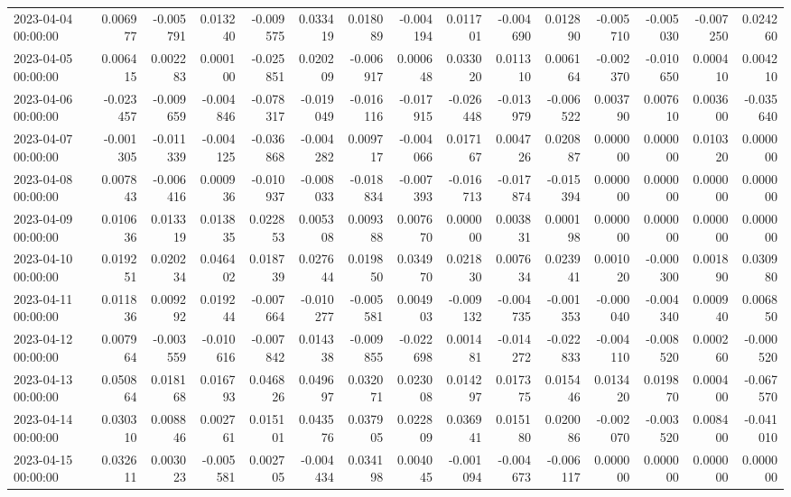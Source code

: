 \begin{tabular}{lrrrrrrrrrrrrrr}
2023-04-04 00:00:00 & 0.006977 & -0.005791 & 0.013240 & -0.009575 & 0.033419 & 0.018089 & -0.004194 & 0.011701 & -0.004690 & 0.012890 & -0.005710 & -0.005030 & -0.007250 & 0.024260 \\
2023-04-05 00:00:00 & 0.006415 & 0.002283 & 0.000100 & -0.025851 & 0.020209 & -0.006917 & 0.000648 & 0.033020 & 0.011310 & 0.006164 & -0.002370 & -0.010650 & 0.000410 & 0.004210 \\
2023-04-06 00:00:00 & -0.023457 & -0.009659 & -0.004846 & -0.078317 & -0.019049 & -0.016116 & -0.017915 & -0.026448 & -0.013979 & -0.006522 & 0.003790 & 0.007610 & 0.003600 & -0.035640 \\
2023-04-07 00:00:00 & -0.001305 & -0.011339 & -0.004125 & -0.036868 & -0.004282 & 0.009717 & -0.004066 & 0.017167 & 0.004726 & 0.020887 & 0.000000 & 0.000000 & 0.010320 & 0.000000 \\
2023-04-08 00:00:00 & 0.007843 & -0.006416 & 0.000936 & -0.010937 & -0.008033 & -0.018834 & -0.007393 & -0.016713 & -0.017874 & -0.015394 & 0.000000 & 0.000000 & 0.000000 & 0.000000 \\
2023-04-09 00:00:00 & 0.010636 & 0.013319 & 0.013835 & 0.022853 & 0.005308 & 0.009388 & 0.007670 & 0.000000 & 0.003831 & 0.000198 & 0.000000 & 0.000000 & 0.000000 & 0.000000 \\
2023-04-10 00:00:00 & 0.019251 & 0.020234 & 0.046402 & 0.018739 & 0.027644 & 0.019850 & 0.034970 & 0.021830 & 0.007634 & 0.023941 & 0.001020 & -0.000300 & 0.001890 & 0.030980 \\
2023-04-11 00:00:00 & 0.011836 & 0.009292 & 0.019244 & -0.007664 & -0.010277 & -0.005581 & 0.004903 & -0.009132 & -0.004735 & -0.001353 & -0.000040 & -0.004340 & 0.000940 & 0.006850 \\
2023-04-12 00:00:00 & 0.007964 & -0.003559 & -0.010616 & -0.007842 & 0.014338 & -0.009855 & -0.022698 & 0.001481 & -0.014272 & -0.022833 & -0.004110 & -0.008520 & 0.000260 & -0.000520 \\
2023-04-13 00:00:00 & 0.050864 & 0.018168 & 0.016793 & 0.046826 & 0.049697 & 0.032071 & 0.023008 & 0.014297 & 0.017375 & 0.015446 & 0.013420 & 0.019870 & 0.000400 & -0.067570 \\
2023-04-14 00:00:00 & 0.030310 & 0.008846 & 0.002761 & 0.015101 & 0.043576 & 0.037905 & 0.022809 & 0.036941 & 0.015180 & 0.020086 & -0.002070 & -0.003520 & 0.008400 & -0.041010 \\
2023-04-15 00:00:00 & 0.032611 & 0.003023 & -0.005581 & 0.002705 & -0.004434 & 0.034198 & 0.004045 & -0.001094 & -0.004673 & -0.006117 & 0.000000 & 0.000000 & 0.000000 & 0.000000 \\

\end{tabular}
